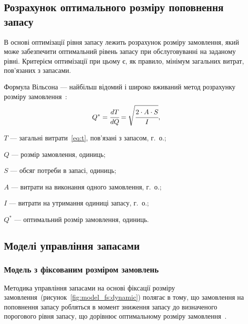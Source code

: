 \subsection{Розрахунок оптимального розміру поповнення запасу}
В основі оптимізації рівня запасу лежить розрахунок розміру замовлення, який може забезпечити оптимальний рівень запасу при обслуговуванні на заданому рівні.
Критерієм оптимізації при цьому є, як правило, мінімум загальних витрат, пов'язаних з запасами.

Формула Вільсона --- найбільш відомий і широко вживаний метод розрахунку розміру замовлення~\cite{Sterligova2008}:
\begin{equation}
Q^*=\cfrac{dT}{dQ}=\sqrt{\cfrac{2\cdot A\cdot S}{I}}
,
\end{equation}
\begin{description}
	\item[де] $T$ --- загальні витрати~\eqref{eq:t}, пов'язані з запасом, г.~о.;
	\item $Q$ --- розмір замовлення, одиниць;
	\item $S$ --- обсяг потреби в запасі, одиниць;
	\item $A$ --- витрати на виконання одного замовлення, г.~о.;
	\item $I$ --- витрати на утримання одиниці запасу, г.~о.;
	\item $Q^*$ --- оптимальний розмір замовлення, одиниць.
\end{description}

\subsection{Моделі управління запасами}
\subsubsection{Модель з фіксованим розміром замовлень}
Методика управління запасами на основі фіксації розміру замовлення~(рисунок~\ref{fig:model_fs:dynamic}) полягає в тому, що замовлення на поповнення запасу робляться в момент зниження запасу до визначеного порогового рівня запасу, що дорівнює оптимальному розміру замовлення~\cite{Sterligova2008}. 

